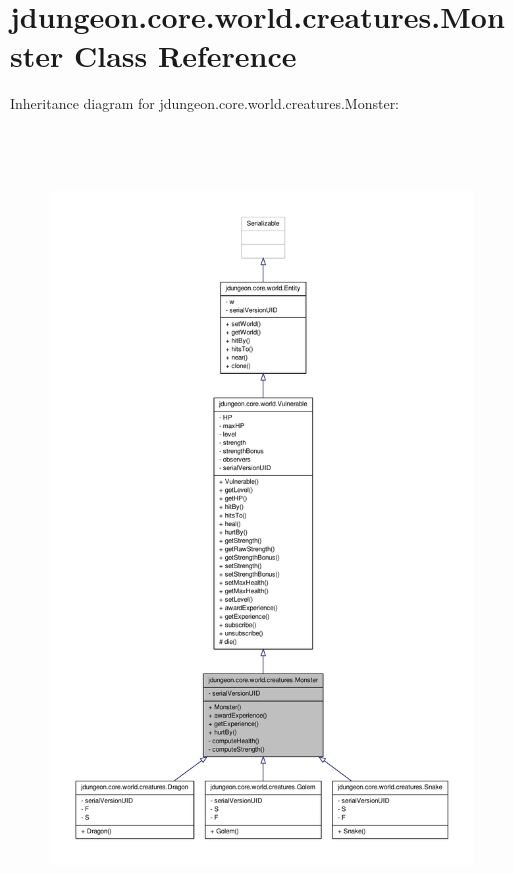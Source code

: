 \hypertarget{classjdungeon_1_1core_1_1world_1_1creatures_1_1_monster}{
\section{jdungeon.core.world.creatures.Monster Class Reference}
\label{classjdungeon_1_1core_1_1world_1_1creatures_1_1_monster}
}


Inheritance diagram for jdungeon.core.world.creatures.Monster:
\nopagebreak
\begin{figure}[H]
\begin{center}
\leavevmode
\includegraphics[height=600pt]{classjdungeon_1_1core_1_1world_1_1creatures_1_1_monster__inherit__graph}
\end{center}
\end{figure}


